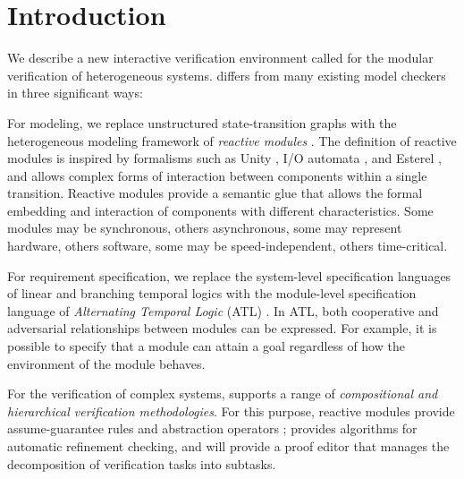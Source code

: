 \section{Introduction}
We describe a new interactive verification environment called \mocha
for the modular verification of heterogeneous systems.
\mocha differs from many existing model checkers in three significant ways:

\begin{itemize}
\vitem 
  For modeling, we replace unstructured state-transition graphs with
  the heterogeneous modeling framework of {\it reactive modules}
  \cite{Modules}.  The definition of reactive modules is inspired by
  formalisms such as Unity \cite{ChandyMisra88}, 
  I/O automata \cite{Lynch}, and Esterel
  \cite{BerryGonthier88}, and allows complex forms of interaction
  between components within a single transition.  Reactive modules provide a
  semantic glue that allows the formal embedding and interaction of
  components with different characteristics.  Some modules may be
  synchronous, others asynchronous, some may represent hardware,
  others software, some may be speed-independent, others
  time-critical.

\vitem
  For requirement specification, we replace the system-level specification 
  languages of linear and branching temporal logics \cite{Pnueli77,CE81}
  with the module-level specification language of 
  {\it Alternating Temporal Logic} (ATL) \cite{ATL}.
  In ATL, both cooperative and adversarial relationships between modules 
  can be expressed.
  For example, it is possible to specify that a module can attain a 
  goal regardless of how the environment of the module behaves.

\vitem 
   For the verification of complex systems, \mocha supports a range of
   {\em compositional and hierarchical verification methodologies}.
   For this purpose, reactive modules provide assume-guarantee rules 
   \cite{HQR98} and abstraction operators \cite{TACAS98};
   \mocha provides algorithms for automatic refinement checking, and 
   will provide a proof editor that manages the decomposition of 
   verification tasks into subtasks.


\end{itemize}

